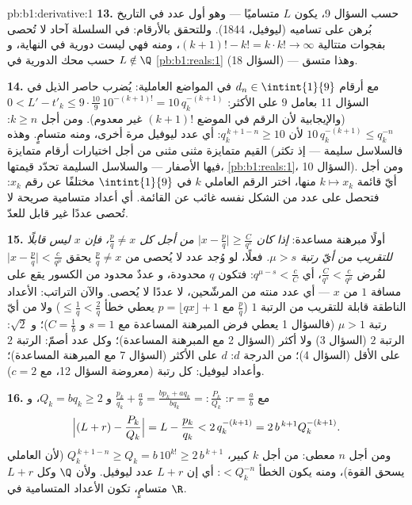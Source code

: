 \begin{solution}{pb:b1:derivative:1}
\textbf{13.} حسب السؤال 9، يكون $L$ متساميًا --- وهو أول
عدد في التاريخ بُرهن على تساميه (ليوفيل، 1844).
وللتحقق بالأرقام: في السلسلة آحاد لا تُحصى بفجوات
متتالية $(k+1)! - k! = k\cdot k! \to \infty$، ومنه فهي
ليست دورية في النهاية، و $L \notin \Q$ حسب محك
الدورية في \cref{pb:b1:reals:1} (السؤال 18) --- وهذا متسق.

\textbf{14.} مع أرقام $d_n \in \intint{1}{9}$ في
المواضع العاملية: يُضرب حاصر الذيل في السؤال 11 بعامل
$9$ على الأكثر: $0 < L' - t'_k \leq 9\cdot\frac{10}{9}\,10^{-(k+1)!} =
10\,q_k^{-(k+1)}$ (والإيجابية لأن الرقم في الموضع
$(k+1)!$ غير معدوم). ومن أجل $k \geq n$: $10\,q_k^{-(k+1)} \leq
q_k^{-n}$ لأن $q_k^{\,k+1-n} \geq 10$: أي عدد ليوفيل
مرة أخرى، ومنه متسامٍ. وهذه القيم متمايزة
مثنى مثنى من أجل اختيارات أرقام متمايزة (فالسلاسل سليمة ---
إذ تكثر فيها الأصفار --- والسلاسل السليمة تحدّد قيمتها،
\cref{pb:b1:reals:1}، السؤال 10). ومن أجل أيّ قائمة $k \mapsto
x_k$ منها، اختر الرقم العاملي $k$ في
$\intint{1}{9}$ مختلفًا عن رقم $x_k$: فتحصل على عدد
من الشكل نفسه غائب عن القائمة. أي أعداد متسامية صريحة
لا تُحصى عددًا غير قابل للعدّ.

\textbf{15.} أولًا مبرهنة مساعدة: \emph{إذا كان $\bigl|x - \frac pq\bigr|
\geq \frac{C}{q^s}$ من أجل كل $\frac pq \neq x$، فإن $x$ ليس
قابلًا للتقريب من أيّ رتبة $\mu > s$.} فعلًا، لو وُجد عدد لا يُحصى من
$\frac pq \neq x$ يحقق $\bigl|x - \frac pq\bigr| <
\frac{c}{q^\mu}$ لفُرض $\frac{C}{q^s} < \frac{c}{q^\mu}$،
أي $q^{\mu - s} < \frac cC$: فتكون $q$ محدودة، و
عددٌ محدود من الكسور يقع على مسافة $1$ من $x$ ---
أي عدد منته من المرشّحين، لا عددًا لا يُحصى. والآن
التراتب: الأعداد الناطقة قابلة للتقريب من الرتبة $1$ ($\frac
pq$ مع $p = \lfloor qx\rfloor + 1$ يعطي خطأ $\leq \frac1q <
\frac2q$) ولا من أيّ رتبة $\mu > 1$ (فالسؤال 1 يعطي
فرض المبرهنة المساعدة مع $s = 1$ و $C = \frac1b$)؛ و $\sqrt2$:
الرتبة $2$ (السؤال 3) ولا أكثر (السؤال 2 مع المبرهنة المساعدة)؛
وكل عدد أصمّ: الرتبة $2$ على الأقل (السؤال 4)؛  من الدرجة
$d$: $d$ على الأكثر (السؤال 7 مع المبرهنة المساعدة)؛ وأعداد ليوفيل:
كل رتبة (معروضة السؤال 12، مع $c = 2$).

\textbf{16.} مع $r = \frac ab$: $\frac{p_k}{q_k} + \frac ab =
\frac{b p_k + a q_k}{b q_k} =: \frac{P_k}{Q_k}$ و $Q_k = b q_k
\geq 2$، و
\[
\Bigl|(L + r) - \frac{P_k}{Q_k}\Bigr| = L - \frac{p_k}{q_k}
< 2\,q_k^{-(k+1)} = 2\,b^{\,k+1} Q_k^{-(k+1)} .
\]
ومن أجل $n$ معطى: من أجل $k$ كبير، $Q_k^{\,k+1-n} \geq Q_k = b\,10^{k!}
\geq 2\,b^{\,k+1}$ (لأن العاملي يسحق القوة)، ومنه يكون
الخطأ $< Q_k^{-n}$: أي إن $L + r$ عدد ليوفيل. ولأن $\Q$ 
وكل $L + r$ متسامٍ، تكون الأعداد المتسامية
 في $\R$.


\end{solution}
